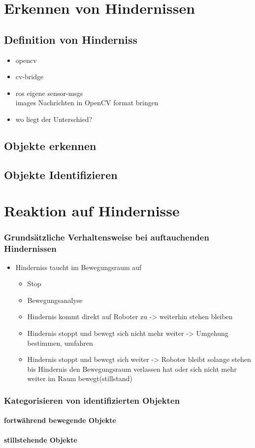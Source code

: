 
	\chapter{Erkennen von Hindernissen}
		\section{Definition von Hinderniss}
		\begin{itemize}
		\item opencv
		\item cv-bridge
		\item ros eigene sensor-msgs\\images Nachrichten in OpenCV format bringen
		\item wo liegt der Unterschied?
		\end{itemize}
		\section{Objekte erkennen}
		
		\section{Objekte Identifizieren}
	\chapter{Reaktion auf Hindernisse}
		\subsection{Grundsätzliche Verhaltensweise bei auftauchenden Hindernissen}
		\begin{itemize}
		\item Hinderniss taucht im Bewegungsraum auf
			\begin{itemize}
				\item Stop
				\item Bewegungsanalyse
				\item Hindernis kommt direkt auf Roboter zu -> weiterhin stehen bleiben
				\item Hindernis stoppt und bewegt sich nicht mehr weiter -> Umgehung bestimmen, umfahren
				\item Hindernis stoppt und bewegt sich weiter -> Roboter bleibt solange stehen bis Hindernis den Bewegungsraum verlassen hat oder sich nicht mehr weiter im Raum bewegt(stillstand) 
			\end{itemize}
		\end{itemize}
		\subsection{Kategorisieren von identifizierten Objekten}
			\subsubsection{fortwährend bewegende Objekte}
			\subsubsection{stillstehende Objekte}